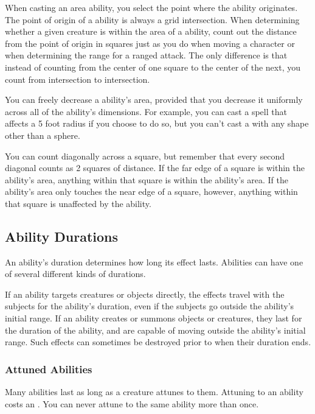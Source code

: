             When casting an area ability, you select the point where the ability originates.
            The point of origin of a ability is always a grid intersection.
            When determining whether a given creature is within the area of a ability, count out the distance from the point of origin in squares just as you do when moving a character or when determining the range for a ranged attack.
            The only difference is that instead of counting from the center of one square to the center of the next, you count from intersection to intersection.

            You can freely decrease a ability's area, provided that you decrease it uniformly across all of the ability's dimensions.
            For example, you can cast a  spell that affects a 5 foot radius if you choose to do so, but you can't cast a  with any shape other than a sphere.

            You can count diagonally across a square, but remember that every second diagonal counts as 2 squares of distance.
            If the far edge of a square is within the ability's area, anything within that square is within the ability's area.
            If the ability's area only touches the near edge of a square, however, anything within that square is unaffected by the ability.

    \subsection{Ability Durations}\label{Ability Durations}

        An ability's duration determines how long its effect lasts.
        Abilities can have one of several different kinds of durations.

        If an ability targets creatures or objects directly, the effects travel with the subjects for the ability's duration, even if the subjects go outside the ability's initial range.
        If an ability creates or summons objects or creatures, they last for the duration of the ability, and are capable of moving outside the ability's initial range.
        Such effects can sometimes be destroyed prior to when their duration ends.

        \subsubsection{Attuned Abilities}\label{Attuned Abilities}
            Many abilities last as long as a creature attunes to them.
            Attuning to an ability costs an .
            You can never attune to the same ability more than once.

